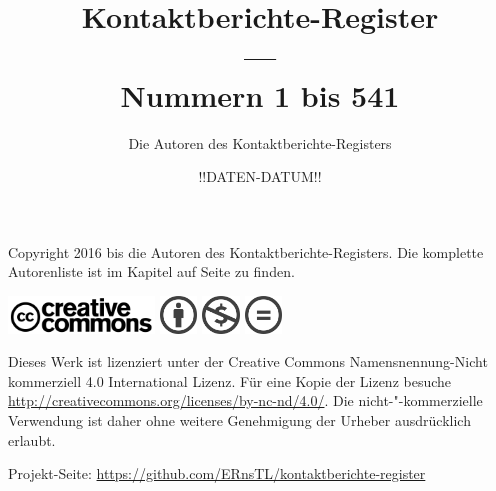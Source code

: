 \documentclass[ngerman,10pt]{book}
\title{Kontaktberichte-Register \\ --- \\ \Large{Nummern 1 bis 541}}
\author{Die Autoren des Kontaktberichte-Registers}
\date{!!DATEN-DATUM!!}%
\begin{document}
\frontmatter



\maketitle




\thispagestyle{empty}
\null    %
\vfill

\noindent Copyright {\textcopyright} 2016 bis {\the\year} die Autoren des Kontaktberichte-Registers. Die komplette Autorenliste ist im Kapitel \emph{} auf Seite \pageref{ch:mitwirkende} zu finden.%

\vspace{2mm}

\includegraphics[height=10mm,keepaspectratio=true]{CreativeCommons_logo_trademark}
\includegraphics[height=10mm,keepaspectratio=true]{chooser_by} \includegraphics[height=10mm,keepaspectratio=true]{chooser_nc} \includegraphics[height=10mm,keepaspectratio=true]{chooser_nd}

\vspace{2mm}

\noindent Dieses Werk ist lizenziert unter der Creative Commons Namensnennung-Nicht kommerziell 4.0 International Lizenz. Für eine Kopie der Lizenz besuche \url{http://creativecommons.org/licenses/by-nc-nd/4.0/}. Die nicht-"-kommerzielle Verwendung ist daher ohne weitere Genehmigung der Urheber ausdrücklich erlaubt.

\vspace{2mm}

\noindent Projekt-Seite: \url{https://github.com/ERnsTL/kontaktberichte-register}

\vspace{2mm}
\end{document}
